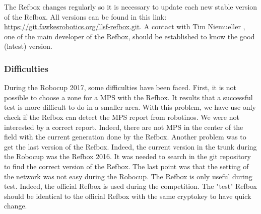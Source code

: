 The Refbox changes regularly so it is necessary to update each new stable version of the Refbox. All versions can be found in this link: \url{https://git.fawkesrobotics.org/llsf-refbox.git}. A contact with Tim Niemueller \cite{RCLL2017}, one of the main developer of the Refbox, should be established to know the good (latest) version. \\


\subsubsection{Difficulties}

During the Robocup 2017, some difficulties have been faced. First, it is not possible to choose a zone for a MPS with the Refbox. It results that a successful test is more difficult to do in a smaller area. With this problem, we have use only check if the Refbox can detect the MPS report from robotinos. We were not interested by a correct report. Indeed, there are not MPS in the center of the field with the current generation done by the Refbox. Another problem was to get the last version of the Refbox. Indeed, the current version in the trunk during the Robocup was the Refbox 2016. It was needed to search in the git repository to find the correct version of the Refbox. The last point was that the setting of the network was not easy during the Robocup. The Refbox is only useful during test. Indeed, the official Refbox is used during the competition. The "test" Refbox should be identical to the official Refbox with the same cryptokey to have quick change. \\
